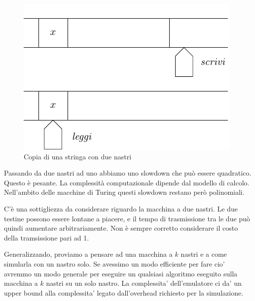 \begin{figure}[h]
    \begin{center}
        \includegraphics{img/CopyString2Tapes.pdf}
        \caption{Copia di una stringa con due nastri}
    \end{center}
\end{figure}

Passando da due nastri ad uno abbiamo uno slowdown che può essere quadratico. Questo è pesante. La
complessità computazionale dipende dal modello di calcolo. Nell'ambito delle macchine di Turing
questi slowdown restano però polinomiali.

C'è una sottigliezza da considerare riguardo la macchina a due nastri. Le due testine possono
essere lontane a piacere, e il tempo di trasmissione tra le due può quindi aumentare
arbitrariamente. Non è sempre corretto considerare il costo della tramsissione pari ad 1.







Generalizzando, proviamo a pensare ad una macchina a $k$ nastri e a come simularla con un nastro
solo. Se avessimo un modo efficiente per fare cio' avremmo un modo generale per eseguire un qualsiasi
algoritmo eseguito sulla macchina a $k$ nastri su un solo nastro. La complessita' dell'emulatore ci
da' un upper bound alla complessita' legato dall'overhead richiesto per la simulazione.


